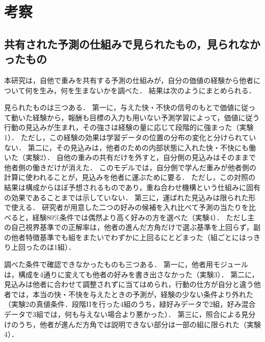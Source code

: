 \section{考察}\label{sec:discussion}

\subsection{共有された予測の仕組みで見られたもの，見られなかったもの}\label{sec:disc-summary}
本研究は，自他で重みを共有する予測の仕組みが，自分の価値の経験から他者について何を生み，何を生まないかを調べた．
結果は次のようにまとめられる．

見られたものは三つある．
第一に，与えた快・不快の信号のもとで価値に従って動いた経験から，報酬も目標の入力も用いない予測学習によって，価値に従う行動の見込みが生まれ，その強さは経験の量に応じて段階的に強まった（実験1）．
ただし，この経験の効果は学習データの位置の分布の変化と分けられていない．
第二に，その見込みは，他者のための内部状態に入れた快・不快にも働いた（実験2）．
自他の重みの共有だけを外すと，自分側の見込みはそのままで他者側の働きだけが消えた．
このモデルでは，自分側で学んだ重みが他者側の計算に使われることが，見込みを他者に運ぶために要る．
ただし，この対照の結果は構成からほぼ予想されるものであり，重ね合わせ機構という仕組みに固有の効果であることまでは示していない．
第三に，運ばれた見込みは限られた形で使える．
研究者が用意した二つの好みの候補を入れ比べて予測の当たりを比べると，経験80\%条件では偶然より高く好みの方を選べた（実験4）．
ただし主の自己視界基準での正解率は，他者の進んだ方角だけで選ぶ基準を上回らず，副の他者特徴基準でも組をまたいでわずかに上回るにとどまった（組ごとにはっきり上回ったのは1組）．

調べた条件で確認できなかったものも三つある．
第一に，他者用モジュールは，構成を4通りに変えても他者の好みを書き出さなかった（実験3）．
第二に，見込みは他者に合わせて調整されずに当てはめられ，行動の仕方が自分と違う他者では，本当の快・不快を与えたときの予測が，経験の少ない条件より外れた（実験2の真値条件．段階IIを行った4組のうち，緑好みデータで2組，好み混合データで3組では，何も与えない場合より悪かった）．
第三に，照合による見分けのうち，他者が進んだ方角では説明できない部分は一部の組に限られた（実験4）．


